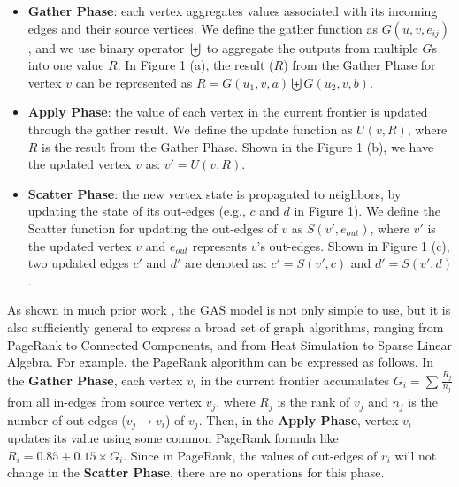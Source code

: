 \begin{itemize}
  \item {\bf Gather Phase}: each vertex aggregates values associated with its incoming edges and their source vertices. 
We define the gather function as $G(u, v, e_{ij})$, and we use binary operator $\biguplus$ to aggregate the outputs 
from multiple $G$s into one value $R$. In Figure 1 (a), the result ($R$) from the Gather Phase for vertex $v$ can be represented 
as $R= G(u_1, v, a)\biguplus G(u_2, v, b)$. 
  \item {\bf Apply Phase}: the value of each vertex in the current frontier is updated through the gather result. 
We define the update function as $U(v, R)$, where $R$ is the result from the Gather Phase. Shown in the Figure 1 (b), 
we have the updated vertex $v$ as: $v' = U(v, R)$.  
  \item {\bf Scatter Phase}: the new vertex state is propagated to neighbors, by updating the state of its out-edges 
(e.g., $c$ and $d$ in Figure 1). We define the Scatter function for updating the out-edges of $v$ as $S(v', e_{out})$, 
where $v'$ is the updated vertex $v$ and $e_{out}$ represents $v$'s out-edges. Shown in Figure 1 (c), two updated edges 
$c'$ and $d'$ are denoted as: $c' = S(v', c)$ and $d' = S(v', d)$.
\end{itemize} 


As shown in much prior work \cite{powergraph, pregel, sc05}, the GAS model is not only simple to use, but it is also sufficiently general to express
a broad set of graph algorithms, ranging from PageRank to Connected Components, and from Heat Simulation to Sparse Linear Algebra. 
For example, the PageRank algorithm \cite{pagerank} can be expressed as follows. In the {\bf Gather Phase}, each vertex $v_i$ in the current 
frontier accumulates $G_i = \sum_{}^{}{\frac{R_j}{n_j}}$ from all in-edges from source vertex $v_j$, where $R_j$ is the rank of 
$v_j$ and $n_j$ is the number of out-edges ($v_j\rightarrow v_i$) of $v_j$. Then, in the {\bf Apply Phase}, vertex $v_i$ updates 
its value using some common PageRank formula like $R_i = 0.85+0.15\times G_i$. Since in PageRank, the values of out-edges of 	$v_i$ will not change 
in the {\bf Scatter Phase}, there are no operations for this phase. 


